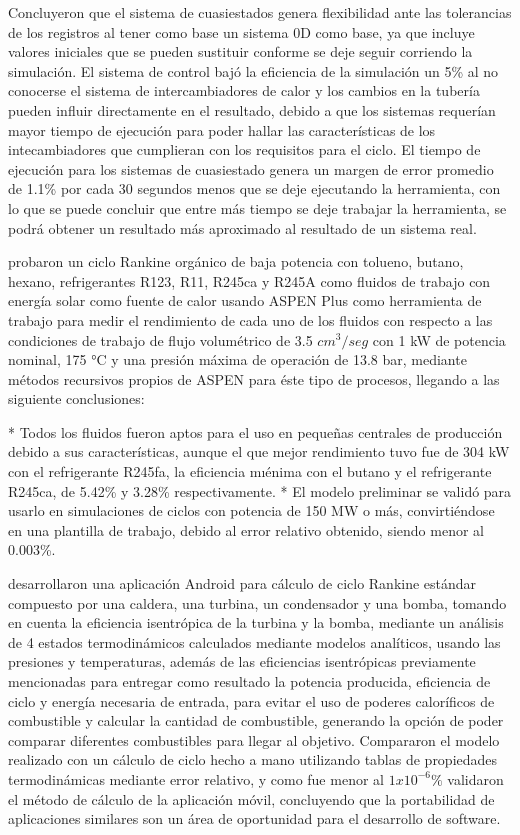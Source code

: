 Concluyeron que el sistema de cuasiestados genera flexibilidad ante las tolerancias de los registros al tener como base un sistema 0D como base, ya que incluye valores iniciales que se pueden sustituir conforme se deje seguir corriendo la simulación. El sistema de control bajó la eficiencia de la simulación un 5\% al no conocerse el sistema de intercambiadores de calor y los cambios en la tubería pueden influir directamente en el resultado, debido a que los sistemas requerían mayor tiempo de ejecución para poder hallar las características de los intecambiadores que cumplieran con los requisitos para el ciclo. El tiempo de ejecución para los sistemas de cuasiestado genera un margen de error promedio de 1.1\% por cada 30 segundos menos que se deje ejecutando la herramienta, con lo que se puede concluir que entre más tiempo se deje trabajar la herramienta, se podrá obtener un resultado más aproximado al resultado de un sistema real.

\textcite{SHALABY2022416} probaron un ciclo Rankine orgánico de baja potencia con tolueno, butano, hexano, refrigerantes R123, R11, R245ca y R245A como fluidos de trabajo con energía solar como fuente de calor usando ASPEN Plus como herramienta de trabajo para medir el rendimiento de cada uno de los fluidos con respecto a las condiciones de trabajo de flujo volumétrico de 3.5 $cm^{3}/seg$ con 1 kW de potencia nominal, 175 °C y una presión máxima de operación de 13.8 bar, mediante métodos recursivos propios de ASPEN para éste tipo de procesos, llegando a las siguiente conclusiones:

\begin{markdown}
* Todos los fluidos fueron aptos para el uso en pequeñas centrales de producción debido a sus características, aunque el que mejor rendimiento tuvo fue de 304 kW con el refrigerante R245fa, la eficiencia mıénima con el butano y el refrigerante R245ca, de 5.42\% y 3.28\% respectivamente.
* El modelo preliminar se validó para usarlo en simulaciones de ciclos con potencia de 150 MW o más, convirtiéndose en una plantilla de trabajo, debido al error relativo obtenido, siendo menor al 0.003\%.
\end{markdown}


\textcite{valverdedesenvolvimento} desarrollaron una aplicación Android para cálculo de ciclo Rankine estándar compuesto por una caldera, una turbina, un condensador y una bomba, tomando en cuenta la eficiencia isentrópica de la turbina y la bomba, mediante un análisis de 4 estados termodinámicos calculados mediante modelos analíticos, usando las presiones y temperaturas, además de las eficiencias isentrópicas previamente mencionadas para entregar como resultado la potencia producida, eficiencia de ciclo y energía necesaria de entrada, para evitar el uso de poderes caloríficos de combustible y calcular la cantidad de combustible, generando la opción de poder comparar diferentes combustibles para llegar al objetivo. Compararon el modelo realizado con un cálculo de ciclo hecho a mano utilizando tablas de propiedades termodinámicas mediante error relativo, y como fue menor al $1x10^{-6} \%$ validaron el método de cálculo de la aplicación móvil, concluyendo que la portabilidad de aplicaciones similares son un área de oportunidad para el desarrollo de software.

